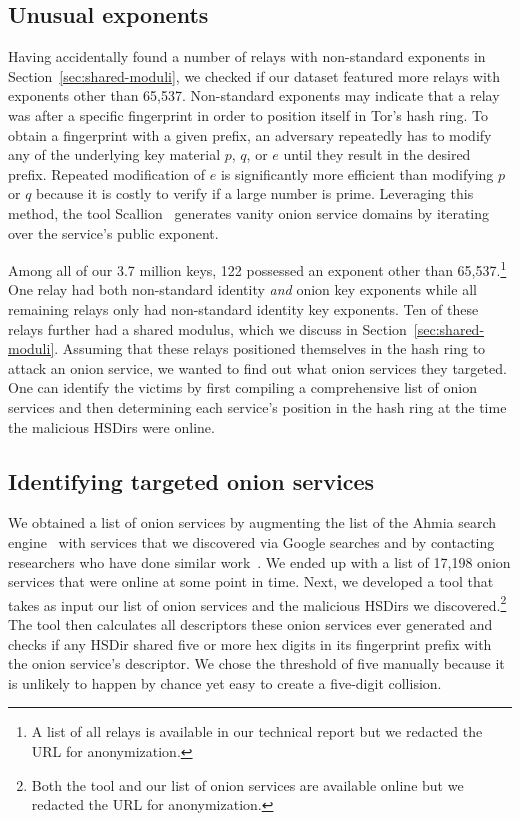 \subsection{Unusual exponents}
\label{sec:unusual-exponents}
Having accidentally found a number of relays with non-standard exponents in
Section~\ref{sec:shared-moduli}, we checked if our dataset featured more relays
with exponents other than 65,537.  Non-standard exponents may indicate that a
relay was after a specific fingerprint in order to position itself in Tor's hash
ring.  To obtain a fingerprint with a given prefix, an adversary repeatedly has
to modify any of the underlying key material $p$, $q$, or $e$ until they result
in the desired prefix.  Repeated modification of $e$ is significantly more
efficient than modifying $p$ or $q$ because it is costly to verify if a large
number is prime.  Leveraging this method, the tool Scallion~\cite{scallion}
generates vanity onion service domains by iterating over the service's public
exponent.

Among all of our 3.7 million keys, 122 possessed an exponent other than
65,537.\footnote{A list of all relays is available in our technical report but
we redacted the URL for anonymization.} One relay had both non-standard
identity \emph{and} onion key exponents while all remaining relays only had
non-standard identity key exponents.  Ten of these relays further had a shared
modulus, which we discuss in Section~\ref{sec:shared-moduli}.  Assuming that
these relays positioned themselves in the hash ring to attack an onion service,
we wanted to find out what onion services they targeted.  One can identify the
victims by first compiling a comprehensive list of onion services and then
determining each service's position in the hash ring at the time the malicious
HSDirs were online.

\subsection{Identifying targeted onion services}
\label{sec:targeted-onion-services}

We obtained a list of onion services by augmenting the list of the Ahmia
search engine~\cite{ahmia} with services that we discovered via Google searches
and by contacting researchers who have done similar work~\cite{Matic2015a}.  We
ended up with a list of 17,198 onion services that were online at some point in
time.  Next, we developed a tool that takes as input our list of onion services
and the malicious HSDirs we discovered.\footnote{Both the tool and our list of
onion services are available online but we redacted the URL for anonymization.}
The tool then calculates all descriptors these onion services ever generated and
checks if any HSDir shared five or more hex digits in its fingerprint prefix
with the onion service's descriptor.  We chose the threshold of five manually
because it is unlikely to happen by chance yet easy to create a five-digit
collision.

